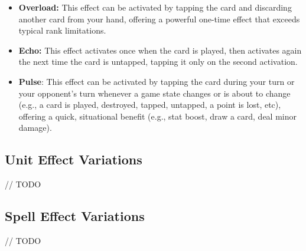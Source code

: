 \begin{itemize}
	\item \textbf{Overload:} This effect can be activated by tapping the card and discarding another card from your hand, offering a powerful one-time effect that exceeds typical rank limitations.
	\item \textbf{Echo:} This effect activates once when the card is played, then activates again the next time the card is untapped, tapping it only on the second activation.
	\item \textbf{Pulse}: This effect can be activated by tapping the card during your turn or your opponent’s turn whenever a game state changes or is about to change (e.g., a card is played, destroyed, tapped, untapped, a point is lost, etc), offering a quick, situational benefit (e.g., stat boost, draw a card, deal minor damage).
\end{itemize}

\subsection{Unit Effect Variations}
// TODO

\subsection{Spell Effect Variations}
// TODO


